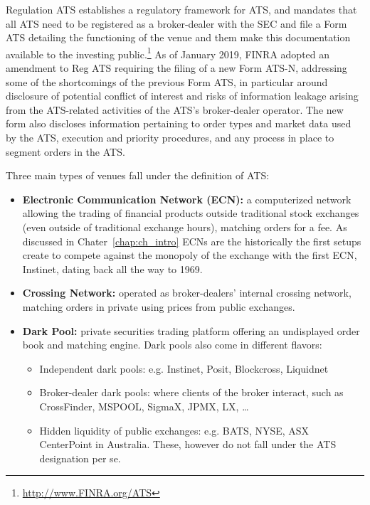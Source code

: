 Regulation ATS establishes a regulatory framework for ATS, and mandates that all ATS need to be registered as a broker-dealer with the SEC and file a Form ATS detailing the functioning of the venue and them make this documentation available to the investing public.\footnote{\url{http://www.FINRA.org/ATS}} As of January 2019, FINRA adopted an amendment to Reg ATS requiring the filing of a new Form ATS-N, addressing some of the shortcomings of the previous Form ATS, in particular around disclosure of potential conflict of interest and risks of information leakage arising from the ATS-related activities of the ATS's broker-dealer operator. The new form also discloses information pertaining to order types and market data used by the ATS, execution and priority procedures, and any process in place to segment orders in the ATS.


Three main types of venues fall under the definition of ATS:

\begin{itemize}
\item{\textbf{Electronic Communication Network (ECN):}} a computerized network allowing the trading of financial products outside traditional stock exchanges (even outside of traditional exchange hours), matching orders for a fee. As discussed in Chater~\ref{chap:ch_intro} ECNs are the historically the first setups create to compete against the monopoly of the exchange with the first ECN, Instinet, dating back all the way to 1969. 

\item{\textbf{Crossing Network:}} operated as broker-dealers' internal crossing network, matching orders in private using prices from public exchanges.

\item{\textbf{Dark Pool:}} \label{in:dark} private securities trading platform offering an undisplayed order book and matching engine. Dark pools also come in different flavors:
        \begin{itemize}
        \item{Independent dark pools:} e.g. Instinet, Posit, Blockcross, Liquidnet 
        \item{Broker-dealer dark pools:} where clients of the broker interact, such as  CrossFinder, MSPOOL, SigmaX, JPMX, LX, \dots
        \item{Hidden liquidity of public exchanges:} e.g. BATS, NYSE, ASX CenterPoint in Australia. These, however do not fall under the ATS designation per se.
        \end{itemize}
\end{itemize}


